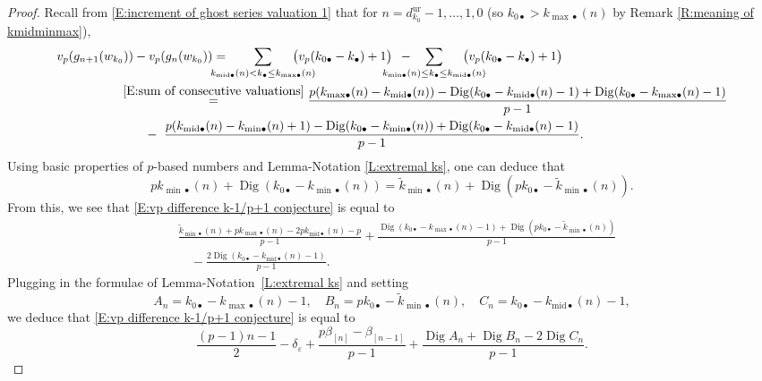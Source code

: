\documentclass[12pt]{amsart}
\theoremstyle{definition}
\numberwithin{equation}{subsection}
\DeclareMathOperator{\Dig}{Dig}
\newcommand{\unr}{\mathrm{ur}}
\newcommand{\midd}{\mathrm{mid}}
\begin{document}
\begin{proof}
Recall from \eqref{E:increment of ghost series valuation 1} that for
$n = d_{k_0}^\unr -1,\dots,1, 0$ (so $k_{0\bullet} > k_{{\max}\bullet}(n)$ by Remark \ref{R:meaning of kmidminmax}),
\begin{eqnarray}
\label{E:vp difference k-1/p+1 conjecture}
\nonumber
 &v_p(g_{n+1}(w_{k_0})) - v_p(g_n(w_{k_0})) = \hspace{-15pt}\displaystyle\sum_{
k_{\midd\bullet}(n) < k_\bullet \leq k_{{\max}\bullet}(n)}
\hspace{-20pt}\big( v_p(k_{0\bullet} - k_\bullet)+1 \big)\ \,-  \hspace{-25pt} \displaystyle\sum_{
k_{{\min}\bullet}(n) \leq k_\bullet \leq k_{{\midd}\bullet}(n)}
\hspace{-20pt}\big( v_p(k_{0\bullet}-k_\bullet)+1 \big)
\\
&\qquad\qquad \quad
\stackrel{\eqref{E:sum of consecutive valuations}}= \dfrac{p(k_{{\max}\bullet}(n) - k_{\midd\bullet}(n)) - \Dig (k_{0\bullet}-k_{\midd\bullet}(n)-1)
+ \Dig(k_{0\bullet} - k_{{\max}\bullet}(n)-1)
}{p-1}
\\
\nonumber
& \qquad\qquad\qquad\quad -\ \dfrac{p(k_{{\midd}\bullet}(n) - k_{{\min}\bullet}(n)+1) - \Dig(k_{0\bullet} - k_{{\min}\bullet}(n)) + \Dig ( k_{0\bullet}- k_{\midd\bullet}(n)-1)
}{p-1}.
\end{eqnarray}
Using basic properties of $p$-based numbers and Lemma-Notation \ref{L:extremal ks}, one can deduce that
\begin{equation*}
pk_{{\min}\bullet}(n)+ \Dig(k_{0\bullet} - k_{{\min}\bullet}(n)) = \tilde k_{{\min}\bullet}(n)+ \Dig(pk_{0\bullet} - \tilde k_{{\min}\bullet}(n)).
\end{equation*}
From this, we see that \eqref{E:vp difference k-1/p+1 conjecture} is equal to
\begin{align*}
&\frac{\tilde k_{{\min}\bullet}(n) +pk_{{\max}\bullet}(n)- 2pk_{{\midd}\bullet}(n)-p}{p-1} + \frac{\Dig(k_{0\bullet}- k_{{\max}\bullet}(n)-1) + \Dig(pk_{0\bullet}  - \tilde k_{{\min}\bullet}(n))}{p-1}
\\
& \quad - \frac{2\Dig(k_{0\bullet}- k_{{\midd}\bullet}(n)-1)}{p-1}.
\end{align*}
Plugging in the formulae of Lemma-Notation~\ref{L:extremal ks} and setting 
\[
A_n = k_{0\bullet}- k_{{\max}\bullet}(n)-1, \quad B_n = pk_{0\bullet}  - \tilde k_{{\min}\bullet}(n), \quad C_n = k_{0\bullet}- k_{{\midd}\bullet}(n)-1, 
\]
we deduce that \eqref{E:vp difference k-1/p+1 conjecture} is equal to
$$
\frac{(p-1)n-1}2 - \delta_\varepsilon +\frac{p\beta_{[n]} - \beta_{[n-1]}}{p-1}
+ \frac{\Dig A_n+\Dig B_n-2\Dig C_n}{p-1}.$$


\end{proof}
\end{document}

